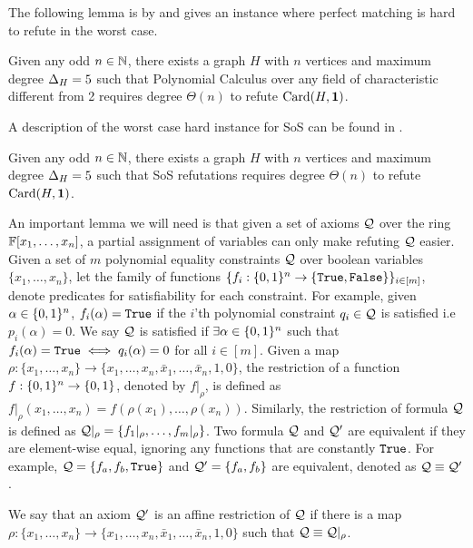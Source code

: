 \documentclass[11pt]{article}
\begin{document}
The following lemma is by \citet{buss1999linear} and gives an instance where perfect matching is hard to refute in the worst case.
\begin{lemma}\label{lemma:worst-case-instance-PC}Given any odd $n \in \mathbb{N}$, there exists a graph $H$ with $n$ vertices and maximum degree $\Delta_{H}= 5$ such that Polynomial Calculus over any field of characteristic different from 2 requires degree $\Theta(n)$ to refute $\text{Card}(H, \mathbf{1})$.
\end{lemma}
A description of the  worst case hard instance for SoS can be found in \citep[Theorem A.3]{Austrin_2022}.

\begin{lemma}\label{lemma:worst-case-instance-sos}
Given any odd $n \in \mathbb{N}$, there exists a graph $H$ with $n$ vertices and maximum degree $\Delta_{H}= 5$ such that SoS refutations requires degree $\Theta(n)$ to refute $\text{Card}(H, \mathbf{1})$.
\end{lemma}

An important lemma we will need is that given a set of axioms $\mathcal{Q}$ over the ring $\mathbb{F}[x_1, \dots, x_n]$, a partial assignment of variables can only make refuting $\mathcal{Q}$ easier.
Given a set of $m$ polynomial equality constraints $\mathcal{Q}$ over boolean variables $\{x_1, \dots, x_n\}$, let the family of functions $\{f_i: \{0,1\}^n \rightarrow \{\texttt{True},\texttt{False}\} \}_{i \in [m]}$, denote predicates for satisfiability for each constraint.
For example, given $\alpha \in \{0,1\}^n$, $f_i(\alpha) = \texttt{True}$ if the $i$'th polynomial constraint $q_i \in \mathcal{Q}$ is satisfied i.e $p_i(\alpha) = 0$.
We say $\mathcal{Q}$ is satisfied if $\exists \alpha \in \{0,1\}^n$ such that $f_i(\alpha) = \texttt{True} \iff q_i(\alpha)=0$ for all $i \in [m]$.
Given a map $\rho: \{x_1, \dots, x_n \} \rightarrow \{x_1, \dots, x_n, \bar{x}_1, \dots, \bar{x}_n, 1, 0 \}$, the restriction of a function $f: \{0,1\}^n \rightarrow \{0,1\}$, denoted by $f|_\rho$, is defined as $f|_\rho(x_1, \dots, x_n) = f(\rho(x_1), \dots, \rho(x_n))$.
Similarly, the restriction of formula $\mathcal{Q}$ is defined as $\mathcal{Q}|_\rho = \{f_{1}|_\rho, \dots, f_{m}|_\rho \}$.
Two formula $\mathcal{Q}$ and $\mathcal{Q}'$ are equivalent if they are element-wise equal, ignoring any functions that are constantly $\texttt{True}$.
For example, $\mathcal{Q} = \{f_a, f_b, \texttt{True} \}$ and $\mathcal{Q}' = \{f_a, f_b\}$ are equivalent, denoted as $\mathcal{Q} \equiv \mathcal{Q}'$.


\begin{definition}\label{def:affine-restriction}
We say that an axiom $\mathcal{Q}'$ is an
affine restriction of $\mathcal{Q}$ if there is a map $\rho : \{x_1,\dots,x_n\} \rightarrow \{x_1, \dots, x_n, \bar{x}_1, \dots, \bar{x}_n, 1, 0 \}$ such that $\mathcal{Q} \equiv \mathcal{Q}|_{\rho}$.
\end{definition}
\end{document}
